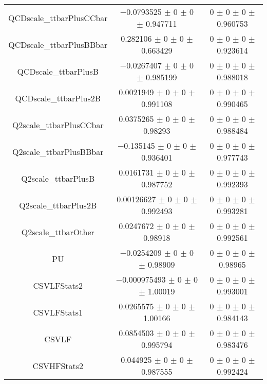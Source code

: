\begin{table}
\begin{tabular}{ccc}
QCDscale\_ttbarPlusCCbar 	& \num{-0.0793525} $\pm$ \num{0} $\pm$ \num{0} $\pm$ \num{0.947711} 	& \num{0} $\pm$ \num{0} $\pm$ \num{0} $\pm$ \num{0.960753}\\
QCDscale\_ttbarPlusBBbar 	& \num{0.282106} $\pm$ \num{0} $\pm$ \num{0} $\pm$ \num{0.663429} 	& \num{0} $\pm$ \num{0} $\pm$ \num{0} $\pm$ \num{0.923614}\\
QCDscale\_ttbarPlusB 	& \num{-0.0267407} $\pm$ \num{0} $\pm$ \num{0} $\pm$ \num{0.985199} 	& \num{0} $\pm$ \num{0} $\pm$ \num{0} $\pm$ \num{0.988018}\\
QCDscale\_ttbarPlus2B 	& \num{0.0021949} $\pm$ \num{0} $\pm$ \num{0} $\pm$ \num{0.991108} 	& \num{0} $\pm$ \num{0} $\pm$ \num{0} $\pm$ \num{0.990465}\\
Q2scale\_ttbarPlusCCbar 	& \num{0.0375265} $\pm$ \num{0} $\pm$ \num{0} $\pm$ \num{0.98293} 	& \num{0} $\pm$ \num{0} $\pm$ \num{0} $\pm$ \num{0.988484}\\
Q2scale\_ttbarPlusBBbar 	& \num{-0.135145} $\pm$ \num{0} $\pm$ \num{0} $\pm$ \num{0.936401} 	& \num{0} $\pm$ \num{0} $\pm$ \num{0} $\pm$ \num{0.977743}\\
Q2scale\_ttbarPlusB 	& \num{0.0161731} $\pm$ \num{0} $\pm$ \num{0} $\pm$ \num{0.987752} 	& \num{0} $\pm$ \num{0} $\pm$ \num{0} $\pm$ \num{0.992393}\\
Q2scale\_ttbarPlus2B 	& \num{0.00126627} $\pm$ \num{0} $\pm$ \num{0} $\pm$ \num{0.992493} 	& \num{0} $\pm$ \num{0} $\pm$ \num{0} $\pm$ \num{0.993281}\\
Q2scale\_ttbarOther 	& \num{0.0247672} $\pm$ \num{0} $\pm$ \num{0} $\pm$ \num{0.98918} 	& \num{0} $\pm$ \num{0} $\pm$ \num{0} $\pm$ \num{0.992561}\\
PU 	& \num{-0.0254209} $\pm$ \num{0} $\pm$ \num{0} $\pm$ \num{0.98909} 	& \num{0} $\pm$ \num{0} $\pm$ \num{0} $\pm$ \num{0.98965}\\
CSVLFStats2 	& \num{-0.000975493} $\pm$ \num{0} $\pm$ \num{0} $\pm$ \num{1.00019} 	& \num{0} $\pm$ \num{0} $\pm$ \num{0} $\pm$ \num{0.993001}\\
CSVLFStats1 	& \num{0.0265575} $\pm$ \num{0} $\pm$ \num{0} $\pm$ \num{1.00166} 	& \num{0} $\pm$ \num{0} $\pm$ \num{0} $\pm$ \num{0.984143}\\
CSVLF 	& \num{0.0854503} $\pm$ \num{0} $\pm$ \num{0} $\pm$ \num{0.995794} 	& \num{0} $\pm$ \num{0} $\pm$ \num{0} $\pm$ \num{0.983476}\\
CSVHFStats2 	& \num{0.044925} $\pm$ \num{0} $\pm$ \num{0} $\pm$ \num{0.987555} 	& \num{0} $\pm$ \num{0} $\pm$ \num{0} $\pm$ \num{0.992424}\\

\end{tabular}
\end{table}
